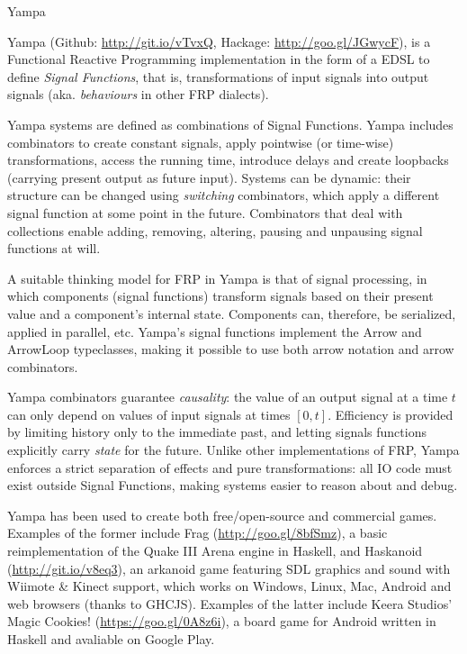 \begin{hcarentry}[updated]{Yampa}
\label{yampa}
\makeheader

Yampa (Github: \href{http://git.io/vTvxQ}{http://git.io/vTvxQ}, Hackage:
\href{http://goo.gl/JGwycF}{http://goo.gl/JGwycF}), is a Functional Reactive
Programming implementation in the form of a EDSL to define \emph{Signal
Functions}, that is, transformations of input signals into output signals (aka.
\emph{behaviours} in other FRP dialects).

Yampa systems are defined as combinations of Signal Functions.  Yampa includes
combinators to create constant signals, apply  pointwise (or time-wise)
transformations, access the running time, introduce delays and create loopbacks
(carrying present output as future input). Systems can be dynamic: their
structure can be changed using \emph{switching} combinators, which apply a
different signal function at some point in the future. Combinators that deal
with collections enable adding, removing, altering, pausing and unpausing
signal functions at will.

A suitable thinking model for FRP in Yampa is that of signal processing, in
which components (signal functions) transform signals based on their present
value and a component's internal state. Components can, therefore, be
serialized, applied in parallel, etc. Yampa's signal functions implement the
Arrow and ArrowLoop typeclasses, making it possible to use both arrow
notation and arrow combinators.

Yampa combinators guarantee \emph{causality}: the value of an output signal at
a time $t$ can only depend on values of input signals at times $[0,t]$.
Efficiency is provided by limiting history only to the immediate past, and
letting signals functions explicitly carry \emph{state} for the future.  Unlike
other implementations of FRP, Yampa enforces a strict separation of effects and
pure transformations: all IO code must exist outside Signal Functions,
making systems easier to reason about and debug.

Yampa has been used to create both free/open-source and commercial games.
Examples of the former include Frag (\href{http://goo.gl/8bfSmz}{http://goo.gl/8bfSmz}), a basic
reimplementation of the Quake III Arena engine in Haskell, and Haskanoid
(\href{http://git.io/v8eq3}{http://git.io/v8eq3}), an arkanoid game featuring
SDL graphics and sound with Wiimote \& Kinect support, which works on Windows,
Linux, Mac, Android and web browsers (thanks to GHCJS). Examples of the latter
include Keera Studios' Magic Cookies!
(\href{https://goo.gl/0A8z6i}{https://goo.gl/0A8z6i}), a board game for Android
written in Haskell and avaliable on Google Play.


\end{hcarentry}
